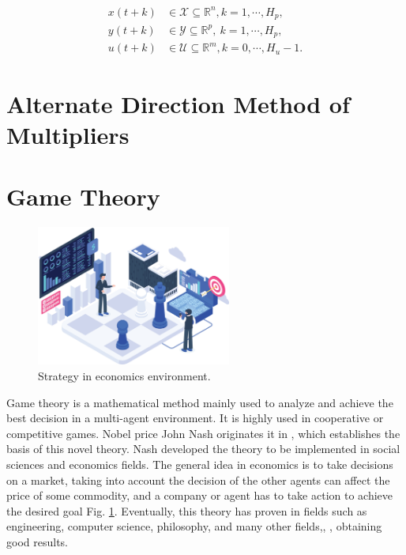\begin{align}
x(t+k) & \in \mathcal{X} \subseteq \mathbb{R}^n, k=1,\cdots,H_p, \\
y(t+k) & \in \mathcal{Y} \subseteq \mathbb{R}^p,\  k=1,\cdots,H_p, \\
u(t+k) & \in \mathcal{U} \subseteq \mathbb{R}^m, k=0,\cdots,H_u-1.
\end{align}


\section{Alternate Direction Method of Multipliers}
\section{Game Theory}

\begin{figure}[H]
\begin{center}
    \includegraphics[width=0.57\textwidth]{Kap2/Strategy.png}
    \caption{Strategy in economics environment.}
    \label{fig:game_theory}
\end{center}
\end{figure}

Game theory is a mathematical method mainly used to analyze and achieve the best decision in a multi-agent environment. It is highly used in cooperative or competitive games. Nobel price John Nash originates it in \cite{nash_novel}, which establishes the basis of this novel theory.
Nash developed the theory to be implemented in social sciences and economics fields. The general idea in economics is to take decisions on a market, taking into account the decision of the other agents can affect the price of some commodity, and a company or agent has to take action to achieve the desired goal Fig. \ref{fig:game_theory}. Eventually, this theory has proven in fields such as engineering, computer science, philosophy, and many other fields,\cite{33t_GameTheory2}, \cite{46t_inproceedings}, obtaining good results. 

